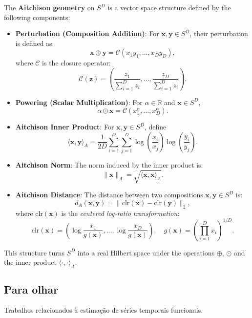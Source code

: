 \documentclass[article]{abntex2}
\begin{document}
The \textbf{Aitchison geometry} on $S^D$ is a vector space structure defined by the following components:

\begin{itemize}
    \item \textbf{Perturbation (Composition Addition)}: For $\mathbf{x}, \mathbf{y} \in S^D$, their perturbation is defined as:
    \[
    \mathbf{x} \oplus \mathbf{y} = \mathcal{C}(x_1 y_1, \dots, x_D y_D),
    \]
    where $\mathcal{C}$ is the closure operator:
    \[
    \mathcal{C}(\mathbf{z}) = \left( \frac{z_1}{\sum_{i=1}^D z_i}, \dots, \frac{z_D}{\sum_{i=1}^D z_i} \right).
    \]
    
    \item \textbf{Powering (Scalar Multiplication)}: For $\alpha \in \mathbb{R}$ and $\mathbf{x} \in S^D$,
    \[
    \alpha \odot \mathbf{x} = \mathcal{C}(x_1^\alpha, \dots, x_D^\alpha).
    \]
    
    \item \textbf{Aitchison Inner Product}: For $\mathbf{x}, \mathbf{y} \in S^D$, define
    \[
    \langle \mathbf{x}, \mathbf{y} \rangle_A = \frac{1}{2D} \sum_{i=1}^D \sum_{j=1}^D \log\left(\frac{x_i}{x_j}\right) \log\left(\frac{y_i}{y_j}\right).
    \]
    
    \item \textbf{Aitchison Norm}: The norm induced by the inner product is:
    \[
    \|\mathbf{x}\|_A = \sqrt{\langle \mathbf{x}, \mathbf{x} \rangle_A}.
    \]
    
    \item \textbf{Aitchison Distance}: The distance between two compositions $\mathbf{x}, \mathbf{y} \in S^D$ is:
    \[
    d_A(\mathbf{x}, \mathbf{y}) = \|\text{clr}(\mathbf{x}) - \text{clr}(\mathbf{y})\|_2,
    \]
    where $\text{clr}(\mathbf{x})$ is the \emph{centered log-ratio transformation}:
    \[
    \text{clr}(\mathbf{x}) = \left( \log\frac{x_1}{g(\mathbf{x})}, \dots, \log\frac{x_D}{g(\mathbf{x})} \right), \quad g(\mathbf{x}) = \left( \prod_{i=1}^D x_i \right)^{1/D}.
    \]
\end{itemize}

This structure turns $S^D$ into a real Hilbert space under the operations $\oplus$, $\odot$ and the inner product $\langle \cdot, \cdot \rangle_A$.

\subsection{Para olhar}

Trabalhos relacionados à estimação de séries temporais funcionais.
\end{document}
